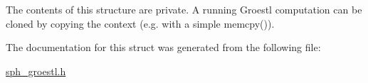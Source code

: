 The contents of this structure are private. A running Groestl computation can be cloned by copying the context (e.\+g. with a simple {\ttfamily memcpy()}). 

The documentation for this struct was generated from the following file\+:\begin{DoxyCompactItemize}
\item 
\mbox{\hyperlink{sph__groestl_8h}{sph\+\_\+groestl.\+h}}\end{DoxyCompactItemize}
